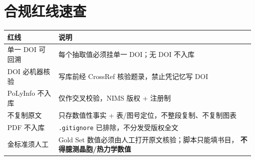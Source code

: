 \documentclass[11pt,a4paper]{ctexart}
\begin{document}
\section{合规红线速查}

\begin{table}[htbp]
\centering
\begin{tabularx}{\textwidth}{l X}
\toprule
红线 & 说明 \\
\midrule
单一 DOI 可回溯 & 每个抽取值必须挂单一 DOI；无 DOI 不入库 \\
DOI 必机器核验 & 写库前经 CrossRef 核验题录，禁止凭记忆写 DOI \\
PoLyInfo 不入库 & 仅作交叉校验，NIMS 版权 + 注册制 \\
不复制原文 & 只存数值性事实 + 表/图号定位，不整段复制、不复制图表 \\
PDF 不入库 & \texttt{.gitignore} 已排除，不分发受版权全文 \\
金标准须人工 & Gold Set 数值必须由人工打开原文核验；脚本只能填书目，
                \textbf{不得臆测晶胞/热力学数值} \\
\bottomrule
\end{tabularx}
\end{table}

\appendix
\end{document}
